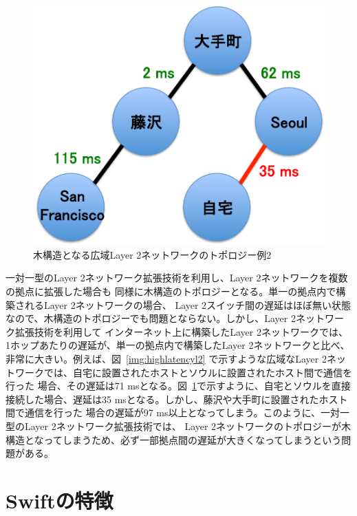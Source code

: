 \begin{figure}
	\begin{center}
		\includegraphics[scale=0.50]{./img/homeandseoul}
		\caption{木構造となる広域Layer 2ネットワークのトポロジー例2}
		\label{img:homeandseoul}
	\end{center}
\end{figure}

一対一型のLayer 2ネットワーク拡張技術を利用し、Layer 2ネットワークを複数の拠点に拡張した場合も
同様に木構造のトポロジーとなる。単一の拠点内で構築されるLayer 2ネットワークの場合、
Layer 2スイッチ間の遅延はほぼ無い状態なので、木構造のトポロジーでも問題とならない。しかし、Layer 2ネットワーク拡張技術を利用して
インターネット上に構築したLayer 2ネットワークでは、1ホップあたりの遅延が、単一の拠点内で構築したLayer 2ネットワークと比べ、非常に大きい。例えば、図~\ref{img:highlatencyl2}
で示すような広域なLayer 2ネットワークでは、自宅に設置されたホストとソウルに設置されたホスト間で通信を行った
場合、その遅延は71 msとなる。図~\ref{img:homeandseoul}で示すように、自宅とソウルを直接
接続した場合、遅延は35 msとなる。しかし、藤沢や大手町に設置されたホスト間で通信を行った
場合の遅延が97 ms以上となってしまう。このように、一対一型のLayer 2ネットワーク拡張技術では、
Layer 2ネットワークのトポロジーが木構造となってしまうため、必ず一部拠点間の遅延が大きくなってしまうという問題がある。


\section{Swiftの特徴}
\label{rw:pointtomulti}

